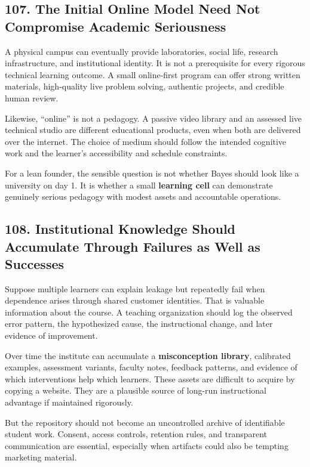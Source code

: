 \subsection*{107. The Initial Online Model Need Not Compromise Academic Seriousness}

A physical campus can eventually provide laboratories, social life, research infrastructure, and institutional identity. It is not a prerequisite for every rigorous technical learning outcome. A small online-first program can offer strong written materials, high-quality live problem solving, authentic projects, and credible human review.

Likewise, ``online'' is not a pedagogy. A passive video library and an assessed live technical studio are different educational products, even when both are delivered over the internet. The choice of medium should follow the intended cognitive work and the learner's accessibility and schedule constraints.

For a lean founder, the sensible question is not whether Bayes should look like a university on day 1. It is whether a small \textbf{learning cell} can demonstrate genuinely serious pedagogy with modest assets and accountable operations.

\subsection*{108. Institutional Knowledge Should Accumulate Through Failures as Well as Successes}

Suppose multiple learners can explain leakage but repeatedly fail when dependence arises through shared customer identities. That is valuable information about the course. A teaching organization should log the observed error pattern, the hypothesized cause, the instructional change, and later evidence of improvement.

Over time the institute can accumulate a \textbf{misconception library}, calibrated examples, assessment variants, faculty notes, feedback patterns, and evidence of which interventions help which learners. These assets are difficult to acquire by copying a website. They are a plausible source of long-run instructional advantage if maintained rigorously.

But the repository should not become an uncontrolled archive of identifiable student work. Consent, access controls, retention rules, and transparent communication are essential, especially when artifacts could also be tempting marketing material.

